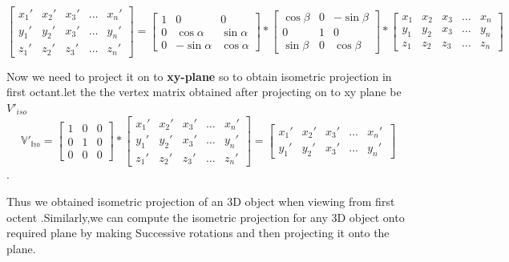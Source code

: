 $$
 \begin{bmatrix}
    x_{1}\prime       & x_{2}\prime & x_{3}\prime  & \dots& x_{n}\prime \\
    y_{1} \prime      & y_{2}\prime & x_{3}\prime  & \dots & y_{n}\prime \\
    z_{1}\prime       & z_{2}\prime & z_{3}\prime  & \dots & z_{n}\prime
\end{bmatrix} =
 \begin{bmatrix}
    1      & 0 & 0  \\
   0      & \cos\alpha & \sin\alpha   \\
    0      & -\sin\alpha & \cos\alpha  
\end{bmatrix} *
 \begin{bmatrix}
    \cos\beta      & 0 & -\sin\beta  \\
    0      &1 & 0   \\
    \sin\beta      &0 & \cos\beta 
\end{bmatrix} *
 \begin{bmatrix}
    x_{1}       & x_{2} & x_{3}  & \dots& x_{n} \\
    y_{1}       & y_{2} & x_{3}  & \dots & y_{n} \\
    z_{1}       & z_{2} & z_{3}  & \dots & z_{n}
\end{bmatrix} 
$$


 Now we need to project it on to \textbf{xy-plane} so to obtain isometric projection in first octant.let the the vertex matrix obtained after projecting on to xy plane be $V\prime_{iso}$\\
 \[\mathbb{V\prime_{iso}} =  
 \begin{bmatrix}
    1      & 0 & 0  \\
   0      & 1 & 0  \\
    0      & 0 & 0 
\end{bmatrix} *
 \begin{bmatrix}
    x_{1}\prime       & x_{2}\prime & x_{3}\prime  & \dots& x_{n}\prime \\
    y_{1} \prime      & y_{2}\prime & x_{3}\prime  & \dots & y_{n}\prime \\
    z_{1}\prime       & z_{2}\prime & z_{3}\prime  & \dots & z_{n}\prime
\end{bmatrix} =
\begin{bmatrix}
    x_{1}\prime       & x_{2}\prime & x_{3}\prime & \dots & x_{n}\prime \\
    y_{1}\prime       & y_{2}\prime & x_{3}\prime & \dots & y_{n}\prime\
    \end{bmatrix}
\].\par
\indent Thus we obtained isometric projection of an 3D object when viewing from first octent .Similarly,we can compute  the isometric projection for any  3D object onto required plane by making Successive rotations and then projecting it onto the plane. 
 


